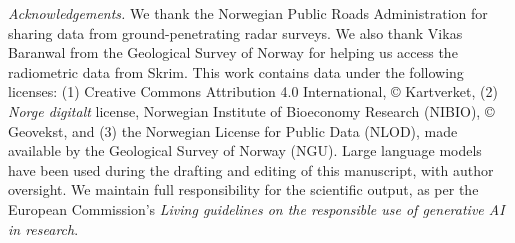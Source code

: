 \documentclass[soil, manuscript]{copernicus}
\begin{document}


\begin{acknowledgements}
\emph{Acknowledgements.} We thank the Norwegian Public Roads Administration for sharing data from ground-penetrating radar surveys. We also thank Vikas Baranwal from the Geological Survey of Norway for helping us access the radiometric data from Skrim. This work contains data under the following licenses: (1) Creative Commons Attribution 4.0 International, © Kartverket, (2) \emph{Norge digitalt} license, Norwegian Institute of Bioeconomy Research (NIBIO), © Geovekst, and (3) the Norwegian License for Public Data (NLOD), made available by the Geological Survey of Norway (NGU). Large language models have been used during the drafting and editing of this manuscript, with author oversight. We maintain full responsibility for the scientific output, as per the European Commission's \emph{Living guidelines on the responsible use of generative AI in research}.
\end{acknowledgements}







\end{document}
